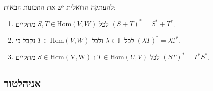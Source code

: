 \documentclass{tstextbook}
\begin{document}
\begin{proposition}
להעתקה הדואלית יש את התכונות הבאות:

  \begin{enumerate}
    \item לכל \(S,T \in \mathrm{Hom}(V,W)\) מתקיים \((S+T)^{*}=S^{*}+T^{*}\). 


    \item לכל \(\lambda \in \mathbb{F}\) ולכל \(T \in \mathrm{Hom}(V,W)\) נקבל כי \(\left( \lambda T \right)^{*}=\lambda T^{*}\). 


    \item לכל \(T \in \mathrm{Hom}(U,V)\) ו-\(S \in \mathrm{Hom(V,W)}\) מתקיים \((ST)^{*}=T^{*}S^{*}\). 


  \end{enumerate}
\end{proposition}
\subsection{אניהלטור}
\end{document}
